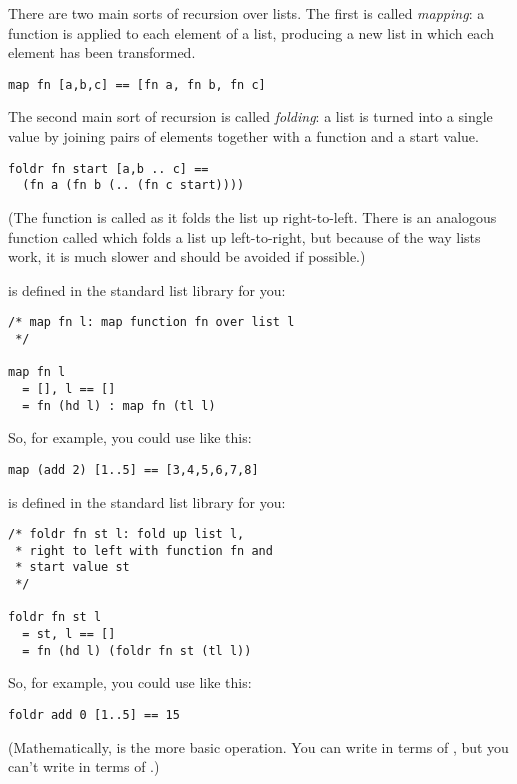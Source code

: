 There are two main sorts of recursion over lists. The first is called 
\emph{mapping}: a function is applied to each element of a list, producing
a new list in which each element has been transformed.

\begin{verbatim}
map fn [a,b,c] == [fn a, fn b, fn c]
\end{verbatim}

The second main sort of recursion is called \emph{folding}: a list is turned
into a single value by joining pairs of elements together with a function and
a start value.

\begin{verbatim}
foldr fn start [a,b .. c] == 
  (fn a (fn b (.. (fn c start))))
\end{verbatim}

\noindent
(The function is called  as it folds the list up right-to-left.
There is an analogous function called  which folds a list up
left-to-right, but because of the way lists work, it is much slower and should
be avoided if possible.)

 is defined in the standard list library for you:

\begin{verbatim}
/* map fn l: map function fn over list l
 */

map fn l
  = [], l == []
  = fn (hd l) : map fn (tl l) 
\end{verbatim}

\noindent
So, for example, you could use  like this:

\begin{verbatim}
map (add 2) [1..5] == [3,4,5,6,7,8]
\end{verbatim}

 is defined in the standard list library for you:

\begin{verbatim}
/* foldr fn st l: fold up list l, 
 * right to left with function fn and 
 * start value st
 */
 
foldr fn st l
  = st, l == []
  = fn (hd l) (foldr fn st (tl l)) 
\end{verbatim}

\noindent
So, for example, you could use  like this:

\begin{verbatim}
foldr add 0 [1..5] == 15
\end{verbatim}

\noindent
(Mathematically,  is the more basic operation. You can write
 in terms of , but you can't write  in terms of
.)

